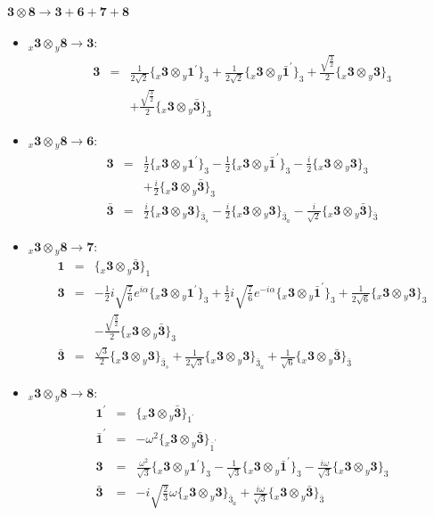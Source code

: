 \documentclass[english]{article}
\newcommand{\rep}[1]{\mathbf{#1}}
\newcommand{\repx}[2]{{}_{#2}\mathbf{#1}}
\newcommand{\subcg}[3]{\big\{ \repx{#1}{x}\otimes\repx{#2}{y}\big\}^{}_{#3}}
\begin{document}
\paragraph*{\Large $\rep{3}\otimes\rep{8}\to\rep{3}+\rep{6}+\rep{7}+\rep{8}$}
\begin{itemize}
\item $\repx{3}{x}\otimes\repx{8}{y}\to\rep{3}$:
\begin{eqnarray*}
\rep{3} &=& \frac{1}{2 \sqrt{2}}\subcg{3}{1^{\prime}}{3}+\frac{1}{2 \sqrt{2}}\subcg{3}{\bar{1}^{\prime}}{3}+\frac{\sqrt{\frac{3}{2}}}{2}\subcg{3}{3}{3} \\ 
 & & +\frac{\sqrt{\frac{3}{2}}}{2}\subcg{3}{\bar{3}}{3}
\end{eqnarray*}
\item $\repx{3}{x}\otimes\repx{8}{y}\to\rep{6}$:
\begin{eqnarray*}
\rep{3} &=& \frac{1}{2}\subcg{3}{1^{\prime}}{3}-\frac{1}{2}\subcg{3}{\bar{1}^{\prime}}{3}-\frac{i}{2}\subcg{3}{3}{3} \\ 
 & & +\frac{i}{2}\subcg{3}{\bar{3}}{3}
\\
\rep{\bar{3}} &=& \frac{i}{2}\subcg{3}{3}{\bar{3}_{s}}-\frac{i}{2}\subcg{3}{3}{\bar{3}_{a}}-\frac{i}{\sqrt{2}}\subcg{3}{\bar{3}}{\bar{3}}
\end{eqnarray*}
\item $\repx{3}{x}\otimes\repx{8}{y}\to\rep{7}$:
\begin{eqnarray*}
\rep{1} &=& \subcg{3}{\bar{3}}{1}
\\
\rep{3} &=& -\frac{1}{2} i \sqrt{\frac{7}{6}} e^{i \alpha }\subcg{3}{1^{\prime}}{3}+\frac{1}{2} i \sqrt{\frac{7}{6}} e^{-i \alpha }\subcg{3}{\bar{1}^{\prime}}{3}+\frac{1}{2 \sqrt{6}}\subcg{3}{3}{3} \\ 
 & & -\frac{\sqrt{\frac{3}{2}}}{2}\subcg{3}{\bar{3}}{3}
\\
\rep{\bar{3}} &=& \frac{\sqrt{3}}{2}\subcg{3}{3}{\bar{3}_{s}}+\frac{1}{2 \sqrt{3}}\subcg{3}{3}{\bar{3}_{a}}+\frac{1}{\sqrt{6}}\subcg{3}{\bar{3}}{\bar{3}}
\end{eqnarray*}
\item $\repx{3}{x}\otimes\repx{8}{y}\to\rep{8}$:
\begin{eqnarray*}
\rep{1^{\prime}} &=& \subcg{3}{\bar{3}}{1^{\prime}}
\\
\rep{\bar{1}^{\prime}} &=& -\omega ^2\subcg{3}{\bar{3}}{\bar{1}^{\prime}}
\\
\rep{3} &=& \frac{\omega ^2}{\sqrt{3}}\subcg{3}{1^{\prime}}{3}-\frac{1}{\sqrt{3}}\subcg{3}{\bar{1}^{\prime}}{3}-\frac{i \omega }{\sqrt{3}}\subcg{3}{3}{3}
\\
\rep{\bar{3}} &=& -i \sqrt{\frac{2}{3}} \omega\subcg{3}{3}{\bar{3}_{a}}+\frac{i \omega }{\sqrt{3}}\subcg{3}{\bar{3}}{\bar{3}}
\end{eqnarray*}
\end{itemize}
\end{document}
